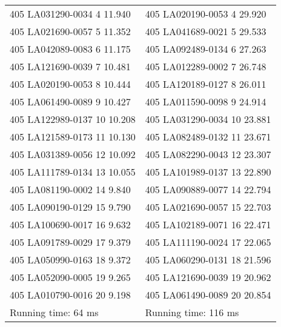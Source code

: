 \begin{tabular}{ l l }
405 LA031290-0034 4 11.940 & 405 LA020190-0053 4 29.920\\
405 LA021690-0057 5 11.352 & 405 LA041689-0021 5 29.533\\
405 LA042089-0083 6 11.175 & 405 LA092489-0134 6 27.263\\
405 LA121690-0039 7 10.481 & 405 LA012289-0002 7 26.748\\
405 LA020190-0053 8 10.444 & 405 LA120189-0127 8 26.011\\
405 LA061490-0089 9 10.427 & 405 LA011590-0098 9 24.914\\
405 LA122989-0137 10 10.208 & 405 LA031290-0034 10 23.881\\
405 LA121589-0173 11 10.130 & 405 LA082489-0132 11 23.671\\
405 LA031389-0056 12 10.092 & 405 LA082290-0043 12 23.307\\
405 LA111789-0134 13 10.055 & 405 LA101989-0137 13 22.890\\
405 LA081190-0002 14 9.840 & 405 LA090889-0077 14 22.794\\
405 LA090190-0129 15 9.790 & 405 LA021690-0057 15 22.703\\
405 LA100690-0017 16 9.632 & 405 LA102189-0071 16 22.471\\
405 LA091789-0029 17 9.379 & 405 LA111190-0024 17 22.065\\
405 LA050990-0163 18 9.372 & 405 LA060290-0131 18 21.596\\
405 LA052090-0005 19 9.265 & 405 LA121690-0039 19 20.962\\
405 LA010790-0016 20 9.198 & 405 LA061490-0089 20 20.854\\
Running time: 64 ms & Running time: 116 ms
\end{tabular}
\newpage
